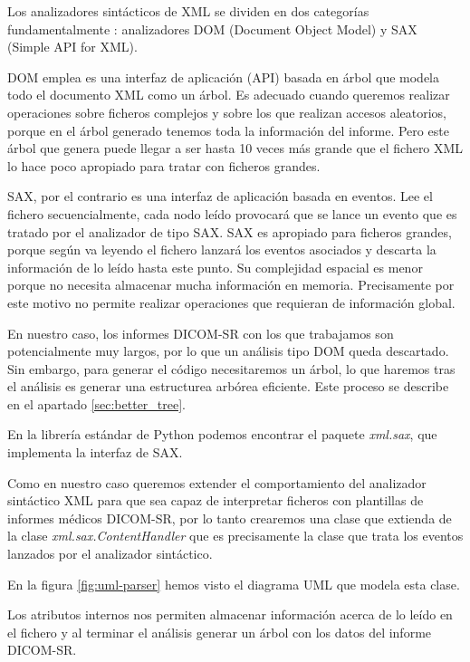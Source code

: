 Los analizadores sintácticos de XML se dividen en dos categorías fundamentalmente \cite{li2009xml}: analizadores DOM (Document Object Model) y SAX (Simple API for XML).\par
DOM emplea es una interfaz de aplicación (API) basada en árbol que modela todo el documento XML como un árbol. Es adecuado cuando queremos realizar operaciones sobre ficheros complejos y sobre los que realizan accesos aleatorios, porque en el árbol generado tenemos toda la información del informe. Pero este árbol que genera puede llegar a ser hasta 10 veces más grande que el fichero XML lo hace poco apropiado para tratar con ficheros grandes.\par
SAX, por el contrario es una interfaz de aplicación basada en eventos. Lee el fichero secuencialmente, cada nodo leído provocará que se lance un evento que es tratado por el analizador de tipo SAX. SAX es apropiado para ficheros grandes, porque según va leyendo el fichero lanzará los eventos asociados y descarta la información de lo leído hasta este punto. Su complejidad espacial es menor porque no necesita almacenar mucha información en memoria. Precisamente por este motivo no permite realizar operaciones que requieran de información global.\par
En nuestro caso, los informes DICOM-SR con los que trabajamos son potencialmente muy largos, por lo que un análisis tipo DOM queda descartado. Sin embargo, para generar el código necesitaremos un árbol, lo que haremos tras el análisis es generar una estructurea arbórea eficiente. Este proceso se describe en el apartado \ref{sec:better_tree}.\medskip\par

En la librería estándar de Python podemos encontrar el paquete \emph{xml.sax}, que implementa la interfaz de SAX.\par
Como en nuestro caso queremos extender el comportamiento del analizador sintáctico XML para que sea capaz de interpretar ficheros con plantillas de informes médicos DICOM-SR, por lo tanto crearemos una clase que extienda de la clase \emph{xml.sax.ContentHandler} que es precisamente la clase que trata los eventos lanzados por el analizador sintáctico.\medskip\par

En la figura \ref{fig:uml-parser} hemos visto el diagrama UML que modela esta clase.\par
Los atributos internos nos permiten almacenar información acerca de lo leído en el fichero y al terminar el análisis generar un árbol con los datos del informe DICOM-SR.\par

